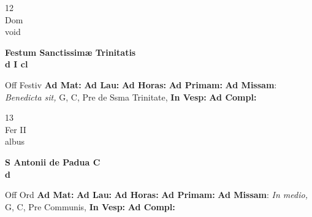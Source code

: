 \documentclass[10pt, openany]{book}
\begin{document}
    \begin{center}
        \begin{minipage}{3.5in}
            \vspace{2em}
            \begin{minipage}{0.5in}
                {\Huge 12} \\
                {\normalsize Dom} \\
                {\normalsize void}
            \end{minipage}
            \begin{minipage}{3.0in}
                \textbf{ \large Festum Sanctissimæ Trinitatis \\
                \textnormal{\normalsize d I cl}} \\ 
            \end{minipage}
            \begin{justify}Off Festiv
                \textbf{Ad Mat: }
                \textbf{Ad Lau: }
                \textbf{Ad Horas: }
                \textbf{Ad Primam: }\textbf{Ad Missam}: \textit{Benedicta sit,} G, C, Pre de Ssma Trinitate,  
                \textbf{In Vesp: }
                \textbf{Ad Compl: }
            \end{justify}
        \end{minipage}
    \end{center}

    \begin{center}
        \begin{minipage}{3.5in}
            \vspace{2em}
            \begin{minipage}{0.5in}
                {\Huge 13} \\
                {\normalsize Fer II} \\
                {\normalsize albus}
            \end{minipage}
            \begin{minipage}{3.0in}
                \textbf{ \large S Antonii de Padua C \\
                \textnormal{\normalsize d}} \\ 
            \end{minipage}
            \begin{justify}Off Ord
                \textbf{Ad Mat: }
                \textbf{Ad Lau: }
                \textbf{Ad Horas: }
                \textbf{Ad Primam: }\textbf{Ad Missam}: \textit{In medio,} G, C, Pre Communis,  
                \textbf{In Vesp: }
                \textbf{Ad Compl: }
            \end{justify}
        \end{minipage}
    \end{center}
\end{document}
